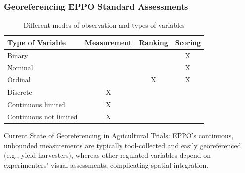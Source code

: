 \documentclass[aspectratio=43]{beamer}
\begin{document}
\begin{frame}
    \frametitle{Georeferencing EPPO Standard Assessments}
    
    \begin{table}[ht]
        \caption{\small Different modes of observation and types of variables}
        \label{tab:data_types_slide}
        \centering
        \begin{tabular}{|l|c|c|c|}
        \hline
        \textbf{Type of Variable} & \textbf{Measurement} & \textbf{Ranking} & \textbf{Scoring} \\
        \hline
        \rowcolor{red!20} Binary & & & X \\
        \hline
        \rowcolor{red!20} Nominal & & & X \\
        \hline
        \rowcolor{red!20} Ordinal & & X & X \\
        \hline
        \rowcolor{red!20} Discrete & X & & \\
        \hline
        \rowcolor{red!20} Continuous limited & X & & \\
        \hline
        \rowcolor{green!20} Continuous not limited & X & & \\
        \hline
        \end{tabular}
        \end{table}
        
    \begin{flushleft}
        \hspace{1.5cm}{\tiny Summary from EPPO PP 1/152: Design and analysis of efficacy evaluation trials}
    \end{flushleft}
    
    \vspace{1em}
    
    \begin{block}{Current State of Georeferencing in Agricultural Trials:}
        \small EPPO's continuous, unbounded measurements are typically tool-collected and easily georeferenced (e.g., yield harvesters), whereas other regulated variables depend on experimenters' visual assessments, complicating spatial integration.
    \end{block}
\end{frame}

\end{document}
